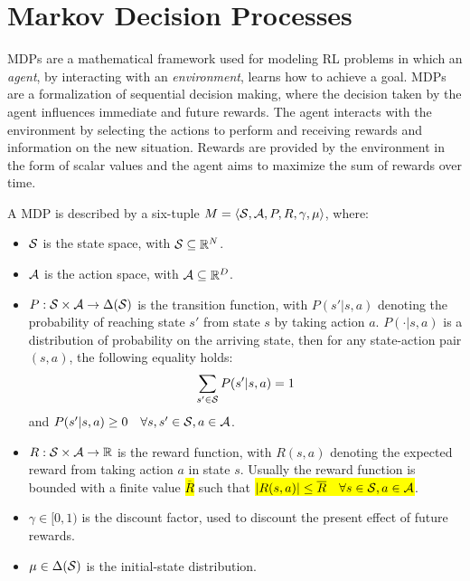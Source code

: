 \section{Markov Decision Processes}\label{sec:mdp}
\ac{MDPs} are a mathematical framework used for modeling \ac{RL} problems in which an \emph{agent}, by interacting with an \emph{environment}, learns how to achieve a goal. \ac{MDPs} are a formalization of sequential decision making, where the decision taken by the agent influences immediate and future rewards. The agent interacts with the environment by selecting the actions to perform and receiving rewards and information on the new situation. Rewards are provided by the environment in the form of scalar values and the agent aims to maximize the sum of rewards over time.
\begin{definition}[MDP]\label{def:mdp}
A \ac{MDP} is described by a six-tuple $M=\langle \mathcal{S}, \mathcal{A}, P, R, \gamma, \mu \rangle$, where:
\begin{itemize}
	\item $\mathcal{S}$ is the state space, with $\mathcal{S}\subseteq\mathbb{R}^N$.
	\item $\mathcal{A}$ is the action space, with $\mathcal{A}\subseteq\mathbb{R}^D$.
	\item $P: \mathcal{S} \times \mathcal{A} \to \Delta(\mathcal{S})$ is the transition function, with $P(s'|s,a)$ denoting the probability of reaching state $s'$ from state $s$ by taking action $a$. $P(\cdot|s,a)$ is a distribution of probability on the arriving state, then for any state-action pair $(s,a)$, the following equality holds:
	\begin{align} \sum_{s' \in \mathcal{S}} P(s'|s,a) = 1 \end{align}
	and $P(s'|s,a) \geq 0 \quad \forall s, s' \in \mathcal{S}, a \in \mathcal{A}$.
	\item $R: \mathcal{S} \times \mathcal{A} \to \mathbb{R}$ is the reward function, with $R(s,a)$ denoting the expected reward from taking action $a$ in state $s$. Usually the reward function is bounded with a finite value \hl{$\overline{R}$} such that %
	\hl{$|R(s,a)| \leq \overline{R} \quad \forall s \in \mathcal{S}, a \in \mathcal{A}$}. 
	\item $\gamma \in [0, 1)$ is the discount factor, used to discount the present effect of future rewards.
	\item $\mu \in \Delta(\mathcal{S})$ is the initial-state distribution.
\end{itemize}
\end{definition}
